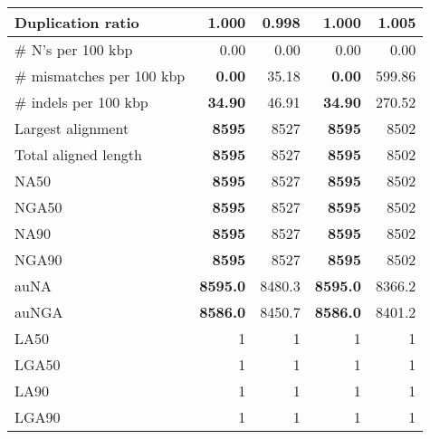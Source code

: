 \documentclass[12pt,a4paper]{article}
\begin{document}
\begin{table}[ht]
\begin{center}
\begin{tabular}{|l*{4}{|r}|}
Duplication ratio & 1.000 & {\bf 0.998} & 1.000 & 1.005 \\ \hline
\# N's per 100 kbp & 0.00 & 0.00 & 0.00 & 0.00 \\ \hline
\# mismatches per 100 kbp & {\bf 0.00} & 35.18 & {\bf 0.00} & 599.86 \\ \hline
\# indels per 100 kbp & {\bf 34.90} & 46.91 & {\bf 34.90} & 270.52 \\ \hline
Largest alignment & {\bf 8595} & 8527 & {\bf 8595} & 8502 \\ \hline
Total aligned length & {\bf 8595} & 8527 & {\bf 8595} & 8502 \\ \hline
NA50 & {\bf 8595} & 8527 & {\bf 8595} & 8502 \\ \hline
NGA50 & {\bf 8595} & 8527 & {\bf 8595} & 8502 \\ \hline
NA90 & {\bf 8595} & 8527 & {\bf 8595} & 8502 \\ \hline
NGA90 & {\bf 8595} & 8527 & {\bf 8595} & 8502 \\ \hline
auNA & {\bf 8595.0} & 8480.3 & {\bf 8595.0} & 8366.2 \\ \hline
auNGA & {\bf 8586.0} & 8450.7 & {\bf 8586.0} & 8401.2 \\ \hline
LA50 & 1 & 1 & 1 & 1 \\ \hline
LGA50 & 1 & 1 & 1 & 1 \\ \hline
LA90 & 1 & 1 & 1 & 1 \\ \hline
LGA90 & 1 & 1 & 1 & 1 \\ \hline
\end{tabular}
\end{center}
\end{table}
\end{document}
